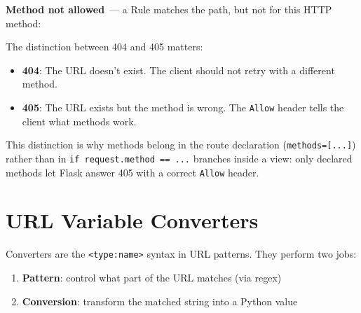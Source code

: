 \noindent{}\textbf{Method not allowed}~--- a Rule matches the path, but not for this HTTP method:

\begin{codebox}[short]

\begin{Shaded}
\begin{Highlighting}[]

\end{Highlighting}
\end{Shaded}

\end{codebox}

\noindent{}The distinction between 404 and 405 matters:

\begin{itemize}
\tightlist
\item
  \textbf{404}: The URL doesn't exist. The client should not retry with a different method.
\item
  \textbf{405}: The URL exists but the method is wrong. The \texttt{Allow} header tells the client what methods work.
\end{itemize}

\noindent{}This distinction is why methods belong in the route declaration (\texttt{methods={[}...{]}}) rather than in \texttt{if\ request.}\allowbreak{}\texttt{method\ =}\allowbreak{}\texttt{=}\allowbreak{}\texttt{\ .}\allowbreak{}\texttt{.}\allowbreak{}\texttt{.} branches inside a view: only declared methods let Flask answer 405 with a correct \texttt{Allow} header.

\setcounter{section}{3}
\section{URL Variable Converters}\label{32-routing:324-url-variable-converters}

Converters are the \texttt{\textless{}type:name\textgreater{}} syntax in URL patterns. They perform two jobs:

\begin{enumerate}
\def\labelenumi{\arabic{enumi}.}
\tightlist
\item
  \textbf{Pattern}: control what part of the URL matches (via regex)
\item
  \textbf{Conversion}: transform the matched string into a Python value
\end{enumerate}

